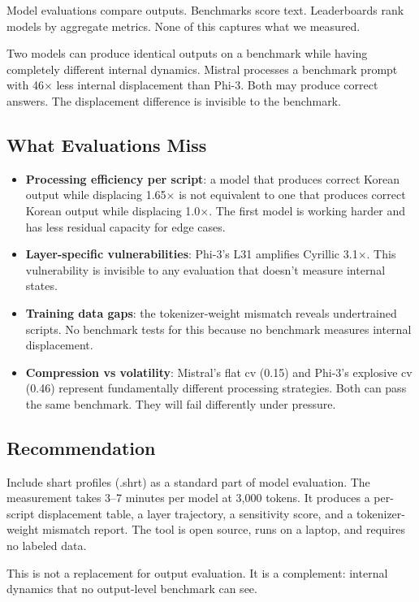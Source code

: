 \documentclass[11pt,a4paper]{article}
\begin{document}
Model evaluations compare outputs. Benchmarks score text. Leaderboards rank models by aggregate metrics. None of this captures what we measured.

Two models can produce identical outputs on a benchmark while having completely different internal dynamics. Mistral processes a benchmark prompt with 46$\times$ less internal displacement than Phi-3. Both may produce correct answers. The displacement difference is invisible to the benchmark.

\subsection{What Evaluations Miss}

\begin{itemize}[nosep]
\item \textbf{Processing efficiency per script}: a model that produces correct Korean output while displacing 1.65$\times$ is not equivalent to one that produces correct Korean output while displacing 1.0$\times$. The first model is working harder and has less residual capacity for edge cases.
\item \textbf{Layer-specific vulnerabilities}: Phi-3's L31 amplifies Cyrillic 3.1$\times$. This vulnerability is invisible to any evaluation that doesn't measure internal states.
\item \textbf{Training data gaps}: the tokenizer-weight mismatch reveals undertrained scripts. No benchmark tests for this because no benchmark measures internal displacement.
\item \textbf{Compression vs volatility}: Mistral's flat cv (0.15) and Phi-3's explosive cv (0.46) represent fundamentally different processing strategies. Both can pass the same benchmark. They will fail differently under pressure.
\end{itemize}

\subsection{Recommendation}

Include shart profiles (.shrt) as a standard part of model evaluation. The measurement takes 3--7 minutes per model at 3{,}000 tokens. It produces a per-script displacement table, a layer trajectory, a sensitivity score, and a tokenizer-weight mismatch report. The tool is open source, runs on a laptop, and requires no labeled data.

This is not a replacement for output evaluation. It is a complement: internal dynamics that no output-level benchmark can see.
\end{document}

